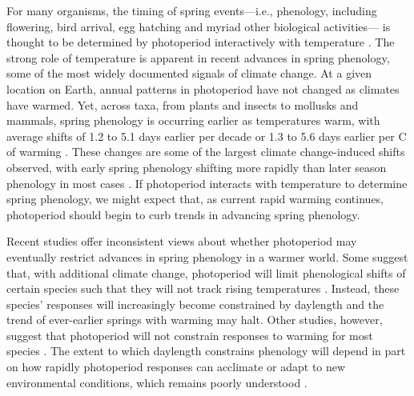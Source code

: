 \documentclass{article}
\begin{document}
\par For many organisms, the timing of spring events---i.e., phenology, including flowering, bird arrival, egg hatching and myriad other biological activities--- is thought to be determined by photoperiod interactively with temperature \citep [][see also Box 1]{fu2019,winkler2014}. The strong role of temperature is apparent in recent advances in spring phenology, some of the most widely documented signals of climate change. At a given location on Earth, annual patterns in photoperiod have not changed as climates have warmed. Yet, across taxa, from plants and insects to mollusks and mammals, spring phenology is occurring earlier as temperatures warm, with average shifts of 1.2 to 5.1 days earlier per decade \citep{bradley1999,parmesan2003, poloczanska2013,root2003} or 1.3 to 5.6 days earlier per \degree C of warming \citep{polgar2013,Wolkovich:2012n}. These changes are some of the largest climate change-induced shifts observed, with early spring phenology shifting more rapidly than later season phenology in most cases \citep{bradley1999,menzel2006}. If photoperiod interacts with temperature to determine spring phenology, we might expect that, as current rapid warming continues, photoperiod should begin to curb trends in advancing spring phenology. 
\par Recent studies offer inconsistent views about whether photoperiod may eventually restrict advances in spring phenology in a warmer world. Some suggest that, with additional climate change, photoperiod will limit phenological shifts of certain species such that they will not track rising temperatures \citep{fu2015,way2015,Basler:2012,koerner2010a}. Instead, these species' responses will increasingly become constrained by daylength and the trend of ever-earlier springs with warming may halt. Other studies, however, suggest that photoperiod will not constrain responses to warming for most species \citep{chuine2010,zohner2016}. The extent to which daylength constrains phenology will depend in part on how rapidly photoperiod responses can acclimate or adapt to new environmental conditions, which remains poorly understood \citep{grevstad2015,bradshaw2007}.
\end{document}
